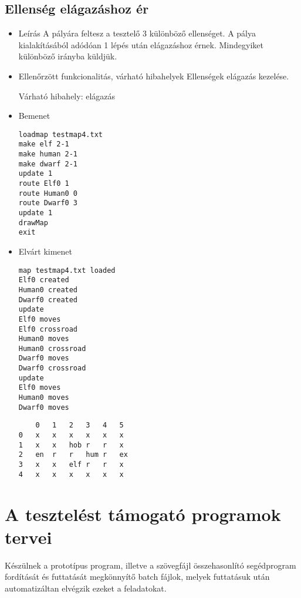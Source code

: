 \subsection{Ellenség elágazáshoz ér}
\begin{itemize}
\item Leírás\newline
A pályára feltesz a tesztelő 3 különböző ellenséget. A pálya kialakításából adódóan 1 lépés után elágazáshoz érnek. Mindegyiket különböző irányba küldjük. 
\item Ellenőrzött funkcionalitás, várható hibahelyek\newline
Ellenségek elágazás kezelése.

Várható hibahely: elágazás
\item Bemenet\newline
\begin{verbatim}
loadmap testmap4.txt
make elf 2-1
make human 2-1
make dwarf 2-1
update 1
route Elf0 1
route Human0 0
route Dwarf0 3
update 1
drawMap
exit
\end{verbatim}
\item Elvárt kimenet\newline
\begin{verbatim}
map testmap4.txt loaded
Elf0 created
Human0 created
Dwarf0 created
update
Elf0 moves
Elf0 crossroad
Human0 moves
Human0 crossroad
Dwarf0 moves
Dwarf0 crossroad
update
Elf0 moves
Human0 moves
Dwarf0 moves
\end{verbatim}
\begin{lstlisting}
	0	1	2	3	4	5
0	x	x	x	x	x	x
1	x	x	hob	r	r	x
2	en	r	r	hum	r	ex
3	x	x	elf	r	r	x
4	x	x	x	x	x	x
\end{lstlisting}
\end{itemize}

\section{A tesztelést támogató programok tervei}

Készülnek a prototípus program, illetve a szövegfájl összehasonlító segédprogram fordítását és futtatását megkönnyítő batch fájlok, melyek futtatásuk után automatizáltan elvégzik ezeket a feladatokat.

